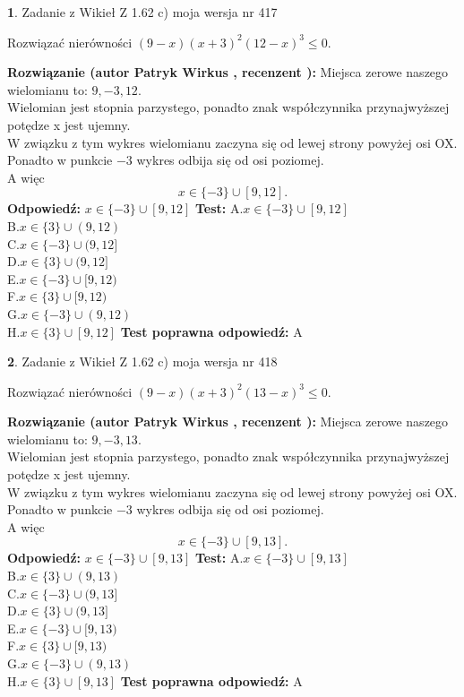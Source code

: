 \documentclass[12pt, a4paper]{article}
\theoremstyle{definition} %
\newtheorem{zad}{}
\newcommand{\zadStart}[1]{\begin{zad}#1\newline}
\newcommand{\zadStop}{\end{zad}}
\newcommand{\rozwStart}[2]{\noindent \textbf{Rozwiązanie (autor #1 , recenzent #2): }\newline}
\newcommand{\rozwStop}{\newline}
\newcommand{\odpStart}{\noindent \textbf{Odpowiedź:}\newline}
\newcommand{\odpStop}{\newline}
\newcommand{\testStart}{\noindent \textbf{Test:}\newline}
\newcommand{\testStop}{\newline}
\newcommand{\kluczStart}{\noindent \textbf{Test poprawna odpowiedź:}\newline}
\newcommand{\kluczStop}{\newline}
\begin{document}
\zadStart{Zadanie z Wikieł Z 1.62 c) moja wersja nr 417}

Rozwiązać nierówności $(9-x)(x+3)^{2}(12-x)^{3}\le0$.
\zadStop
\rozwStart{Patryk Wirkus}{}
Miejsca zerowe naszego wielomianu to: $9, -3, 12$.\\
Wielomian jest stopnia parzystego, ponadto znak współczynnika przy\linebreak najwyższej potędze x jest ujemny.\\ W związku z tym wykres wielomianu zaczyna się od lewej strony powyżej osi OX.\\
Ponadto w punkcie $-3$ wykres odbija się od osi poziomej.\\
A więc $$x \in \{-3\} \cup [9,12].$$
\rozwStop
\odpStart
$x \in \{-3\} \cup [9,12]$
\odpStop
\testStart
A.$x \in \{-3\} \cup [9,12]$\\
B.$x \in \{3\} \cup (9,12)$\\
C.$x \in \{-3\} \cup (9,12]$\\
D.$x \in \{3\} \cup (9,12]$\\
E.$x \in \{-3\} \cup [9,12)$\\
F.$x \in \{3\} \cup [9,12)$\\
G.$x \in \{-3\} \cup (9,12)$\\
H.$x \in \{3\} \cup [9,12]$
\testStop
\kluczStart
A
\kluczStop



\zadStart{Zadanie z Wikieł Z 1.62 c) moja wersja nr 418}

Rozwiązać nierówności $(9-x)(x+3)^{2}(13-x)^{3}\le0$.
\zadStop
\rozwStart{Patryk Wirkus}{}
Miejsca zerowe naszego wielomianu to: $9, -3, 13$.\\
Wielomian jest stopnia parzystego, ponadto znak współczynnika przy\linebreak najwyższej potędze x jest ujemny.\\ W związku z tym wykres wielomianu zaczyna się od lewej strony powyżej osi OX.\\
Ponadto w punkcie $-3$ wykres odbija się od osi poziomej.\\
A więc $$x \in \{-3\} \cup [9,13].$$
\rozwStop
\odpStart
$x \in \{-3\} \cup [9,13]$
\odpStop
\testStart
A.$x \in \{-3\} \cup [9,13]$\\
B.$x \in \{3\} \cup (9,13)$\\
C.$x \in \{-3\} \cup (9,13]$\\
D.$x \in \{3\} \cup (9,13]$\\
E.$x \in \{-3\} \cup [9,13)$\\
F.$x \in \{3\} \cup [9,13)$\\
G.$x \in \{-3\} \cup (9,13)$\\
H.$x \in \{3\} \cup [9,13]$
\testStop
\kluczStart
A
\kluczStop
\end{document}
